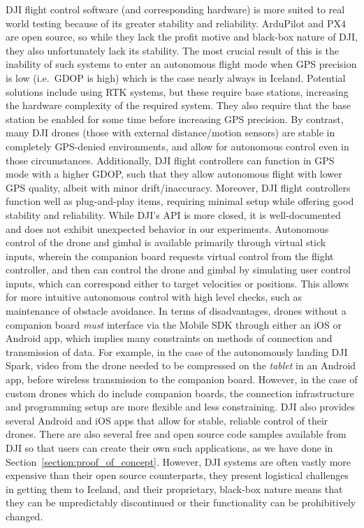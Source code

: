 DJI flight control software (and corresponding hardware) is more suited to real world testing
because of its greater stability and reliability.
ArduPilot and PX4 are open source, so while they lack the profit motive and black-box nature of DJI,
they also unfortunately lack its stability.
The most crucial result of this is the inability of such systems to enter an autonomous flight mode
when GPS precision is low (i.e.~GDOP is high) which is the case nearly always in Iceland.
Potential solutions include using RTK systems, but these require base stations, increasing the hardware complexity
of the required system.
They also require that the base station be enabled for some time before increasing GPS precision.
By contrast, many DJI drones (those with external distance/motion sensors) are stable in completely GPS-denied environments,
and allow for autonomous control even in those circumstances.
Additionally, DJI flight controllers can function in GPS mode with a higher GDOP,
such that they allow autonomous flight with lower GPS quality, albeit with minor drift/inaccuracy.
Moreover, DJI flight controllers function well as plug-and-play items,
requiring minimal setup while offering good stability and reliability.
While DJI's API is more closed, it is well-documented and does not exhibit unexpected behavior in our experiments.
Autonomous control of the drone and gimbal is available primarily through virtual stick inputs,
wherein the companion board requests virtual control from the flight controller,
and then can control the drone and gimbal by simulating user control inputs,
which can correspond either to target velocities or positions.
This allows for more intuitive autonomous control with high level checks, such as maintenance of obstacle avoidance.
In terms of disadvantages, drones without a companion board \textit{must} interface via the Mobile SDK through either an iOS or Android app,
which implies many constraints on methods of connection and transmission of data.
For example, in the case of the autonomously landing DJI Spark, video from the drone needed to be compressed on the \textit{tablet}
in an Android app, before wireless transmission to the companion board.
However, in the case of custom drones which do include companion boards, the connection infrastructure and programming setup are more flexible and less constraining.
DJI also provides several Android and iOS apps that allow for stable, reliable control of their drones.
There are also several free and open source code samples available from DJI so that users can create their own
such applications, as we have done in Section~\ref{section:proof_of_concept}.
However, DJI systems are often vastly more expensive than their open source counterparts,
they present logistical challenges in getting them to Iceland,
and their proprietary, black-box nature means that they can be unpredictably discontinued or their functionality can be prohibitively changed.

